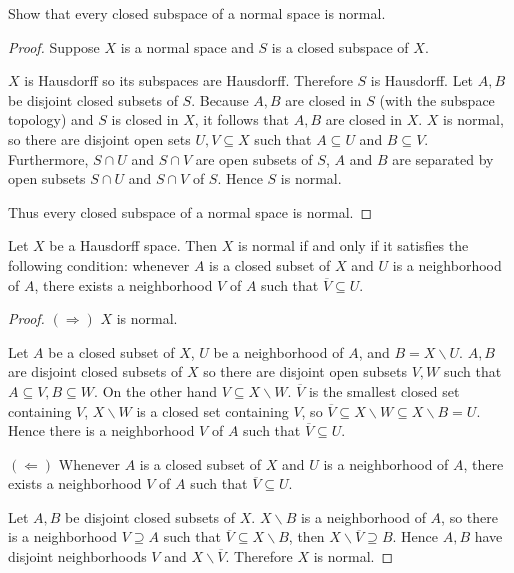 \begin{exercise}{4.79}
	Show that every closed subspace of a normal space is normal.
\end{exercise}

\begin{proof}
	Suppose $X$ is a normal space and $S$ is a closed subspace of $X$.

	$X$ is Hausdorff so its subspaces are Hausdorff. Therefore $S$ is Hausdorff. Let $A, B$ be disjoint closed subsets of $S$. Because $A, B$ are closed in $S$ (with the subspace topology) and $S$ is closed in $X$, it follows that $A, B$ are closed in $X$. $X$ is normal, so there are disjoint open sets $U, V\subseteq X$ such that $A\subseteq U$ and $B\subseteq V$. Furthermore, $S\cap U$ and $S\cap V$ are open subsets of $S$, $A$ and $B$ are separated by open subsets $S\cap U$ and $S\cap V$ of $S$. Hence $S$ is normal.

	Thus every closed subspace of a normal space is normal.
\end{proof}

\begin{lemma}{4.80}
	Let $X$ be a Hausdorff space. Then $X$ is normal if and only if it satisfies the following condition: whenever $A$ is a closed subset of $X$ and $U$ is a neighborhood of $A$, there exists a neighborhood $V$ of $A$ such that $\overline{V} \subseteq U$.
\end{lemma}

\begin{proof}
	$(\Longrightarrow)$ $X$ is normal.

	Let $A$ be a closed subset of $X$, $U$ be a neighborhood of $A$, and $B = X\smallsetminus U$. $A, B$ are disjoint closed subsets of $X$ so there are disjoint open subsets $V, W$ such that $A \subseteq V, B \subseteq W$. On the other hand $V \subseteq X\smallsetminus W$. $\overline{V}$ is the smallest closed set containing $V$, $X\smallsetminus W$ is a closed set containing $V$, so $\overline{V} \subseteq X\smallsetminus W \subseteq X\smallsetminus B = U$. Hence there is a neighborhood $V$ of $A$ such that $\overline{V} \subseteq U$.

	$(\Longleftarrow)$ Whenever $A$ is a closed subset of $X$ and $U$ is a neighborhood of $A$, there exists a neighborhood $V$ of $A$ such that $\overline{V} \subseteq U$.

	Let $A, B$ be disjoint closed subsets of $X$. $X\smallsetminus B$ is a neighborhood of $A$, so there is a neighborhood $V\supseteq A$ such that $\overline{V} \subseteq X\smallsetminus B$, then $X\smallsetminus \overline{V} \supseteq B$. Hence $A, B$ have disjoint neighborhoods $V$ and $X\smallsetminus \overline{V}$. Therefore $X$ is normal.
\end{proof}

